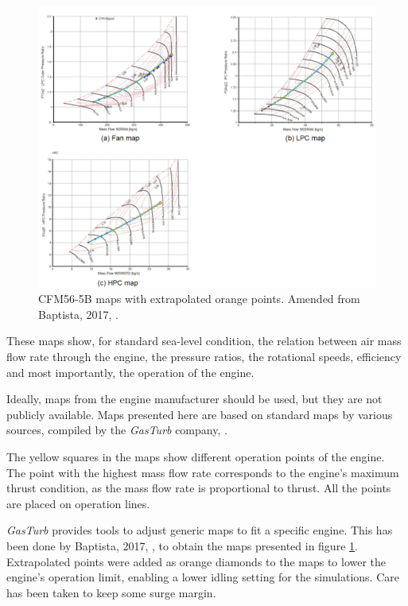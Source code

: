 \documentclass[english]{kththesis}
\begin{document}
\begin{figure}[hb]
    \centering
    \includegraphics[width=1\textwidth]{Epictures/CFM56-5B_Compressor Maps.png}
    \caption{CFM56-5B maps with extrapolated orange points. Amended from Baptista, 2017, \cite{Baptista2017}.}
    \label{fig:CFM56-5BMaps}
\end{figure}

These maps show, for standard sea-level condition, the relation between air mass flow rate through the engine, the pressure ratios, the rotational speeds, efficiency and most importantly, the operation of the engine.

Ideally, maps from the engine manufacturer should be used, but they are not publicly available. Maps presented here are based on standard maps by various sources, compiled by the \textit{GasTurb} company, \cite{Kurzke2020}.

The yellow squares in the maps show different operation points of the engine. The point with the highest mass flow rate corresponds to the engine's maximum thrust condition, as the mass flow rate is proportional to thrust. All the points are placed on operation lines.

\textit{GasTurb} provides tools to adjust generic maps to fit a specific engine. This has been done by Baptista, 2017, \cite{Baptista2017}, to obtain the maps presented in figure \ref{fig:CFM56-5BMaps}. Extrapolated points were added as orange diamonds to the maps to lower the engine's operation limit, enabling a lower idling setting for the simulations. Care has been taken to keep some surge margin.
\end{document}
